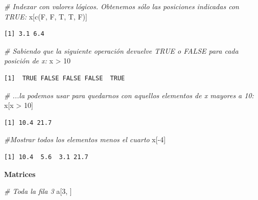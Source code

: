 \documentclass[
]{book}
\newenvironment{Shaded}{\begin{snugshade}}{\end{snugshade}}
\newcommand{\CommentTok}[1]{\textcolor[rgb]{0.56,0.35,0.01}{\textit{#1}}}
\newcommand{\DecValTok}[1]{\textcolor[rgb]{0.00,0.00,0.81}{#1}}
\newcommand{\FunctionTok}[1]{\textcolor[rgb]{0.00,0.00,0.00}{#1}}
\newcommand{\NormalTok}[1]{#1}
\newcommand{\SpecialCharTok}[1]{\textcolor[rgb]{0.00,0.00,0.00}{#1}}
\begin{document}
\begin{Shaded}
\begin{Highlighting}[]
\CommentTok{\# Indexar con valores lógicos. Obtenemos sólo las posiciones indicadas con TRUE:}
\NormalTok{x[}\FunctionTok{c}\NormalTok{(F, F, T, T, F)]}
\end{Highlighting}
\end{Shaded}

\begin{verbatim}
[1] 3.1 6.4
\end{verbatim}

\begin{Shaded}
\begin{Highlighting}[]
\CommentTok{\# Sabiendo que la siguiente operación devuelve TRUE o FALSE para cada posición de x:}
\NormalTok{x }\SpecialCharTok{\textgreater{}} \DecValTok{10}
\end{Highlighting}
\end{Shaded}

\begin{verbatim}
[1]  TRUE FALSE FALSE FALSE  TRUE
\end{verbatim}

\begin{Shaded}
\begin{Highlighting}[]
\CommentTok{\# ...la podemos usar para quedarnos con aquellos elementos de x mayores a 10:}
\NormalTok{x[x }\SpecialCharTok{\textgreater{}} \DecValTok{10}\NormalTok{]}
\end{Highlighting}
\end{Shaded}

\begin{verbatim}
[1] 10.4 21.7
\end{verbatim}

\begin{Shaded}
\begin{Highlighting}[]
\CommentTok{\#Mostrar todos los elementos menos el cuarto}
\NormalTok{x[}\SpecialCharTok{{-}}\DecValTok{4}\NormalTok{]}
\end{Highlighting}
\end{Shaded}

\begin{verbatim}
[1] 10.4  5.6  3.1 21.7
\end{verbatim}

\textbf{Matrices}

\begin{Shaded}
\begin{Highlighting}[]
\CommentTok{\# Toda la fila 3}
\NormalTok{a[}\DecValTok{3}\NormalTok{, ]}
\end{Highlighting}
\end{Shaded}
\end{document}
